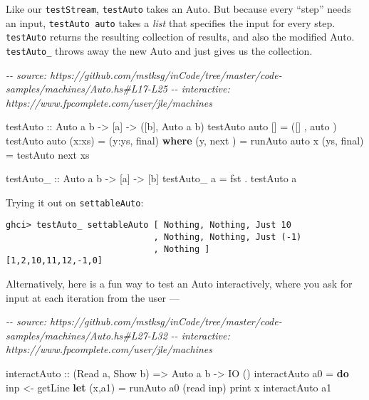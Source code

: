 \documentclass[]{article}
\newenvironment{Shaded}{}{}
\newcommand{\CommentTok}[1]{\textcolor[rgb]{0.38,0.63,0.69}{\textit{#1}}}
\newcommand{\DataTypeTok}[1]{\textcolor[rgb]{0.56,0.13,0.00}{#1}}
\newcommand{\FunctionTok}[1]{\textcolor[rgb]{0.02,0.16,0.49}{#1}}
\newcommand{\KeywordTok}[1]{\textcolor[rgb]{0.00,0.44,0.13}{\textbf{#1}}}
\newcommand{\NormalTok}[1]{#1}
\newcommand{\OperatorTok}[1]{\textcolor[rgb]{0.40,0.40,0.40}{#1}}
\newcommand{\OtherTok}[1]{\textcolor[rgb]{0.00,0.44,0.13}{#1}}
\begin{document}
Like our \texttt{testStream}, \texttt{testAuto} takes an Auto. But because every
``step'' needs an input, \texttt{testAuto\ auto} takes a \emph{list} that
specifies the input for every step. \texttt{testAuto} returns the resulting
collection of results, and also the modified Auto. \texttt{testAuto\_} throws
away the new Auto and just gives us the collection.

\begin{Shaded}
\begin{Highlighting}[]
\CommentTok{{-}{-} source: https://github.com/mstksg/inCode/tree/master/code{-}samples/machines/Auto.hs\#L17{-}L25}
\CommentTok{{-}{-} interactive: https://www.fpcomplete.com/user/jle/machines}

\OtherTok{testAuto ::} \DataTypeTok{Auto}\NormalTok{ a b }\OtherTok{{-}\textgreater{}}\NormalTok{ [a] }\OtherTok{{-}\textgreater{}}\NormalTok{ ([b], }\DataTypeTok{Auto}\NormalTok{ a b)}
\NormalTok{testAuto auto []      }\OtherTok{=}\NormalTok{ ([]  , auto )}
\NormalTok{testAuto auto (x}\OperatorTok{:}\NormalTok{xs)  }\OtherTok{=}\NormalTok{ (y}\OperatorTok{:}\NormalTok{ys, final)}
  \KeywordTok{where}
\NormalTok{    (y,  next ) }\OtherTok{=}\NormalTok{ runAuto  auto x}
\NormalTok{    (ys, final) }\OtherTok{=}\NormalTok{ testAuto next xs}

\OtherTok{testAuto\_ ::} \DataTypeTok{Auto}\NormalTok{ a b }\OtherTok{{-}\textgreater{}}\NormalTok{ [a] }\OtherTok{{-}\textgreater{}}\NormalTok{ [b]}
\NormalTok{testAuto\_ a }\OtherTok{=} \FunctionTok{fst} \OperatorTok{.}\NormalTok{ testAuto a}
\end{Highlighting}
\end{Shaded}

Trying it out on \texttt{settableAuto}:

\begin{verbatim}
ghci> testAuto_ settableAuto [ Nothing, Nothing, Just 10
                             , Nothing, Nothing, Just (-1)
                             , Nothing ]
[1,2,10,11,12,-1,0]
\end{verbatim}

Alternatively, here is a fun way to test an Auto interactively, where you ask
for input at each iteration from the user ---

\begin{Shaded}
\begin{Highlighting}[]
\CommentTok{{-}{-} source: https://github.com/mstksg/inCode/tree/master/code{-}samples/machines/Auto.hs\#L27{-}L32}
\CommentTok{{-}{-} interactive: https://www.fpcomplete.com/user/jle/machines}

\OtherTok{interactAuto ::}\NormalTok{ (}\DataTypeTok{Read}\NormalTok{ a, }\DataTypeTok{Show}\NormalTok{ b) }\OtherTok{=\textgreater{}} \DataTypeTok{Auto}\NormalTok{ a b }\OtherTok{{-}\textgreater{}} \DataTypeTok{IO}\NormalTok{ ()}
\NormalTok{interactAuto a0 }\OtherTok{=} \KeywordTok{do}
\NormalTok{    inp }\OtherTok{\textless{}{-}} \FunctionTok{getLine}
    \KeywordTok{let}\NormalTok{ (x,a1) }\OtherTok{=}\NormalTok{ runAuto a0 (}\FunctionTok{read}\NormalTok{ inp)}
    \FunctionTok{print}\NormalTok{ x}
\NormalTok{    interactAuto a1}
\end{Highlighting}
\end{Shaded}
\end{document}
